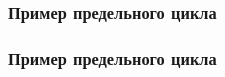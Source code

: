 \documentclass[slidestop,compress,mathserif]{beamer}
\begin{document}
\begin{frame}
\frametitle{Пример предельного цикла}
\begin{figure}[h!]
\vspace{-1em}
\vspace{-2em}
\end{figure}
\end{frame}
\begin{frame}
\frametitle{Пример предельного цикла}
\begin{figure}[h!]
\vspace{-1em}
\vspace{-2em}
\end{figure}
\end{frame}
\end{document}
